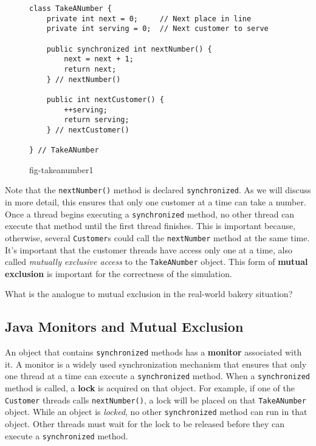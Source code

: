 \begin{figure}[h]
\jjjprogstart
\begin{jjjlisting}
\begin{lstlisting}
class TakeANumber {
    private int next = 0;     // Next place in line
    private int serving = 0;  // Next customer to serve

    public synchronized int nextNumber() {
        next = next + 1;
        return next;
    } // nextNumber()

    public int nextCustomer() {
        ++serving;
        return serving;
    } // nextCustomer()

} // TakeANumber
\end{lstlisting}
\end{jjjlisting}
{fig-takeanumber1}
\end{figure}

Note that the {\tt nextNumber()} method is declared
{\tt synchronized}.  As we will discuss in more detail, this ensures that
only one customer at a time can take a number.   Once a thread begins
executing a {\tt synchronized} method, no other thread can execute that
method until the first thread finishes.
 This is important because,
otherwise, several {\tt Customer}s could call the {\tt nextNumber}
method at the same time.  It's important that the customer threads
have access only one at a time, also called {\em mutually exclusive
access} to the {\tt TakeANumber} object.  This form of {\bf mutual
exclusion} is important for the correctness of
the simulation.

\label{self-study-exercise}
\begin{SSTUDY}

\item What is the analogue to mutual
exclusion in the real-world bakery situation?
\end{SSTUDY}

\subsection{Java Monitors and Mutual Exclusion}
\noindent An object that contains {\tt synchronized} methods has a {\bf monitor}
associated with it.  A monitor is a widely used synchronization
mechanism that ensures that only one thread at a time can execute a
{\tt synchronized} method.   When a {\tt synchronized} method is
called, a {\bf lock} is acquired on that object.  For example, if one
of the {\tt Customer} threads calls {\tt nextNumber()}, a lock will be
placed on that {\tt TakeANumber} object.   While an object is {\it
locked}, no other {\tt synchronized} method can run in that
object.  Other threads must wait for the lock to be released before
they can execute a {\tt synchronized} method.

